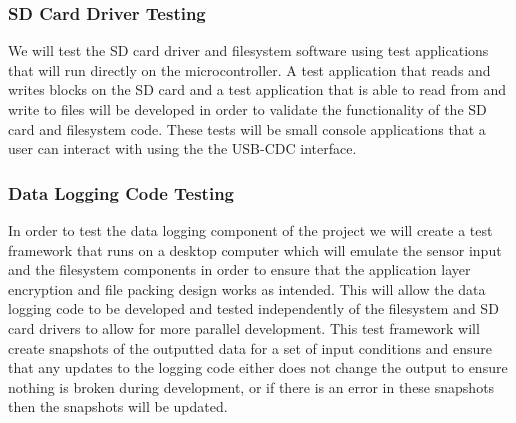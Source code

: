 \subsubsection{SD Card Driver Testing}

We will test the SD card driver and filesystem software using test applications
that will run directly on the microcontroller. A test application that reads
and writes blocks on the SD card and a test application that is able to read
from and write to files will be developed in order to validate the functionality
of the SD card and filesystem code. These tests will be small console
applications that a user can interact with using the the USB-CDC interface.

\subsubsection{Data Logging Code Testing}

In order to test the data logging component of the project we will create a test
framework that runs on a desktop computer which will emulate the sensor input
and the filesystem components in order to ensure that the application layer
encryption and file packing design works as intended. This will allow the data
logging code to be developed and tested independently of the filesystem and SD
card drivers to allow for more parallel development. This test framework will
create snapshots of the outputted data for a set of input conditions and ensure
that any updates to the logging code either does not change the output to ensure
nothing is broken during development, or if there is an error in these snapshots
then the snapshots will be updated.

\fi